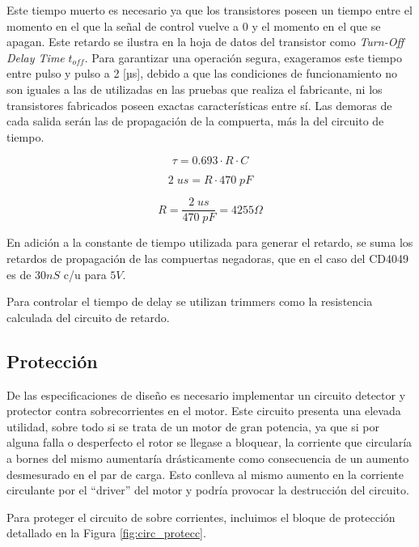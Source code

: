 \documentclass[11pt, a4paper]{article}
\begin{document}
Este tiempo muerto es necesario ya que los transistores poseen un tiempo entre el momento en el que la señal de control vuelve a 0 y el momento en el que se apagan. Este retardo se ilustra en la hoja de datos del transistor como \textit{Turn-Off Delay Time} $t_{off}$. Para garantizar una operación segura, exageramos este tiempo entre pulso y pulso a 2 [µs], debido a que las condiciones de funcionamiento no son iguales a las de utilizadas en las pruebas que realiza el fabricante, ni los transistores fabricados poseen exactas características entre sí. Las demoras de cada salida serán las de propagación de la compuerta, más la del circuito de tiempo. 


\begin{equation}
\tau = 0.693 \cdot R \cdot C
\end{equation}

\begin{equation}
2 \; us = R \cdot 470 \; pF
\end{equation}

\begin{equation}
R = \frac{2 \; us }{470 \; pF} = 4255 \Omega
\end{equation}

En adición a la constante de tiempo utilizada para generar el retardo, se suma los retardos de propagación de las compuertas negadoras, que en el caso del CD4049 es de $30nS$ c/u para $5V$.

Para controlar el tiempo de delay se utilizan trimmers como la resistencia calculada del circuito de retardo.

\subsection{Protección}\label{sec:proteccion}
De las especificaciones de diseño es necesario implementar un circuito detector y protector contra sobrecorrientes en el motor. Este circuito presenta una elevada utilidad, sobre todo si se trata de un motor de gran potencia, ya que si por alguna falla o desperfecto el rotor se llegase a bloquear, la corriente que circularía a bornes del mismo aumentaría drásticamente como consecuencia de un aumento desmesurado en el par de carga. Esto conlleva al mismo aumento en la corriente circulante por el “driver” del motor y podría provocar la destrucción del circuito.

Para proteger el circuito de sobre corrientes, incluimos el bloque de protección detallado en la Figura \ref{fig:circ_protecc}.
\end{document}
